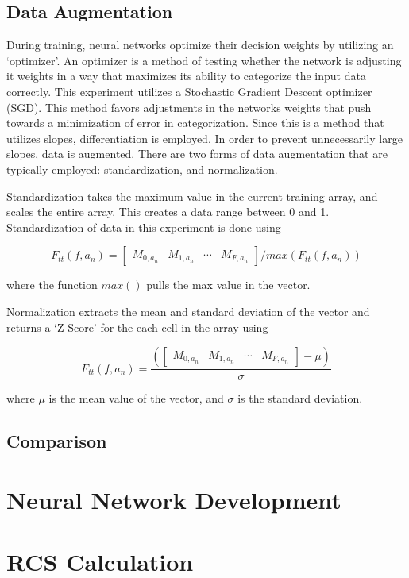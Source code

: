   \subsection{Data Augmentation}
  \label{sec:DA}

    During training, neural networks optimize their decision weights by utilizing an `optimizer'. An optimizer is a method of testing whether the network is adjusting it weights in a way that maximizes its ability to categorize the input data correctly. This experiment utilizes a Stochastic Gradient Descent optimizer (SGD). This method favors adjustments in the networks weights that push towards a minimization of error in categorization. Since this is a method that utilizes slopes, differentiation is employed. In order to prevent unnecessarily large slopes, data is augmented. There are two forms of data augmentation that are typically employed: standardization, and normalization.

    Standardization takes the maximum value in the current training array, and scales the entire array. This creates a data range between 0 and 1. Standardization of data in this experiment is done using

    \begin{equation}\label{eq:F_stan}
      F_{tt}(f, a_n) =
       \begin{bmatrix}
         M_{0, a_n} & M_{1,a_n} & \cdots & M_{F,a_n}
       \end{bmatrix} / max(F_{tt}(f, a_n))
    \end{equation}

    where the function $max()$ pulls the max value in the vector.

    Normalization extracts the mean and standard deviation of the vector and returns a `Z-Score' for the each cell in the array using

    \begin{equation}\label{eq:F_z}
      F_{tt}(f, a_n) =
       \frac{\left(
       \begin{bmatrix}
         M_{0, a_n} & M_{1,a_n} & \cdots & M_{F,a_n}
       \end{bmatrix}
        - \mu \right)}{\sigma}
    \end{equation}

    where $\mu$ is the mean value of the vector, and $\sigma$ is the standard deviation.

  \subsection{Comparison}

\section{Neural Network Development}




\section{RCS Calculation}
